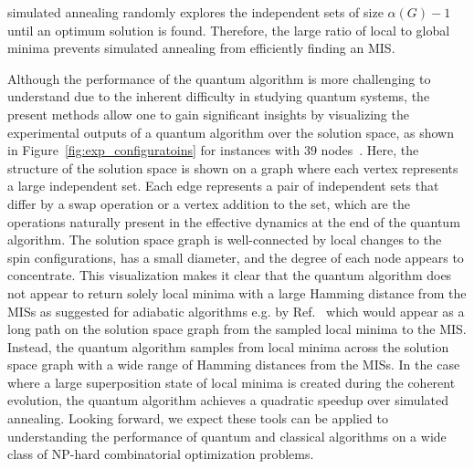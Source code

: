 \documentclass[onefignum, onetabnum]{siamart190516}
\newcommand{\<}{\langle}
\renewcommand{\>}{\rangle}
\begin{document}
simulated annealing randomly explores the independent sets of size $\alpha(G)-1$ until an optimum solution is found.
Therefore, the large ratio of local to global minima  prevents simulated annealing from efficiently finding an MIS.

Although the performance of the quantum algorithm is more challenging to understand due to the inherent difficulty in studying quantum systems, the present methods allow one 
to gain significant insights by visualizing the experimental outputs of a quantum algorithm over the solution space, as shown in Figure~\ref{fig:exp_configuratoins} for instances with $39$ nodes~\cite{Ebadi2022}.
Here, the structure of the solution space is shown on a graph where each vertex represents a large independent set. Each edge represents a pair of independent sets that differ by a swap operation or a vertex addition to the set, which are the operations naturally present in the effective dynamics at the end of the quantum algorithm. 
The solution space graph is well-connected by local changes to the spin configurations, has a small diameter, and the degree of each node appears to concentrate. 
This visualization makes it clear that 
the quantum algorithm does not appear to return solely local minima with a large Hamming distance from the MISs as suggested for adiabatic algorithms e.g. by Ref.~\cite{altshuler2010}  which would appear as a long path on the solution space graph from the sampled local minima to the MIS. Instead, the quantum algorithm samples from local minima across the solution space graph with a wide range of Hamming distances from the MISs. In the case where a large superposition state of local minima is created during the coherent evolution, the quantum algorithm achieves a quadratic speedup over simulated annealing.
Looking forward, we expect these tools can be applied to understanding the performance of quantum and classical algorithms on a wide class of NP-hard combinatorial optimization problems.
\end{document}
